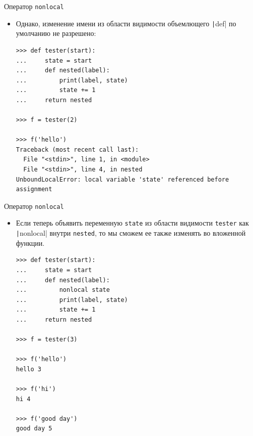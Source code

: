 \documentclass[aspectratio=169]{beamer}%
\begin{document}
\begin{frame}[fragile]{Оператор \texttt{nonlocal}}
\scriptsize
\begin{itemize}
\item Однако, изменение имени из области видимости объемлющего \texttt|def| по умолчанию не разрешено:

\begin{verbatim}
>>> def tester(start):
...     state = start
...     def nested(label):
...         print(label, state)
...         state += 1
...     return nested

>>> f = tester(2)

>>> f('hello')
Traceback (most recent call last):
  File "<stdin>", line 1, in <module>
  File "<stdin>", line 4, in nested
UnboundLocalError: local variable 'state' referenced before assignment
\end{verbatim}
\end{itemize}
\vfill
\end{frame}


\begin{frame}[fragile]{Оператор \texttt{nonlocal}}
\scriptsize
\begin{itemize}
\item Если теперь объявить переменную \texttt{state} из области видимости \texttt{tester} как \texttt|nonlocal| внутри \texttt{nested}, то мы сможем ее также изменять во вложенной функции. 

\begin{verbatim}
>>> def tester(start):
...     state = start
...     def nested(label):
...         nonlocal state
...         print(label, state)
...         state += 1
...     return nested

>>> f = tester(3)

>>> f('hello')
hello 3

>>> f('hi')
hi 4

>>> f('good day')
good day 5
\end{verbatim}
\end{itemize}
\vfill
\end{frame}
\end{document}
